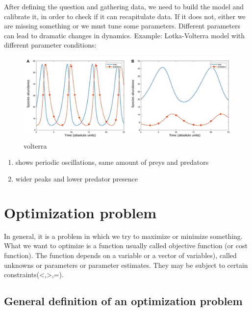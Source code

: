 After defining the question and gathering data, we need to build the
model and calibrate it, in order to check if it can recapitulate data.
If it does not, either we are missing something or we must tune some
parameters. Different parameters can lead to dramatic changes in
dynamics. Example: Lotka-Volterra model with different parameter
conditions:

\begin{figure}
\centering
\includegraphics[width=\textwidth]{volterra.png}
\caption{volterra}
\end{figure}

\begin{enumerate}
\def\labelenumi{\Alph{enumi})}
\item
  shows periodic oscillations, same amount of preys and predators
\item
  wider peaks and lower predator presence
\end{enumerate}

\hypertarget{optimization-problem}{%
\section{Optimization problem}\label{optimization-problem}}

In general, it is a problem in which we try to maximize or minimize
something. What we want to optimize is a function usually called
objective function (or cost function). The function depends on a
variable or a vector of variables), called unknowns or parameters or
parameter estimates. They may be subject to certain
constraints(\textless,\textgreater,=).

\hypertarget{general-definition-of-an-optimization-problem}{%
\subsection{General definition of an optimization
problem}\label{general-definition-of-an-optimization-problem}}


